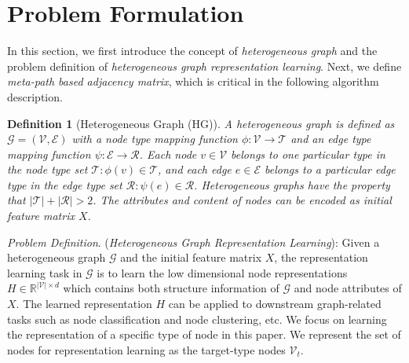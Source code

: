 \documentclass[conference]{IEEEtran}
\newtheorem{defn}{Definition}[section]\usepackage[ruled]{algorithm2e}
\begin{document}
\section{Problem Formulation}
	\label{sec:model}
In this section, we first introduce the concept of \textit{heterogeneous graph} and the problem definition of \textit{heterogeneous graph representation learning}. Next, we define \textit{meta-path based adjacency matrix}, which is critical in the following algorithm description.
	
	\noindent
	\begin{defn}[Heterogeneous Graph (HG)]
		A heterogeneous graph is defined as  $\mathcal{G} = (\mathcal{V}, \mathcal{E})$ with a node type mapping function $\phi : \mathcal{V}  \rightarrow \mathcal{T}$ and an edge type
		mapping function $\psi : \mathcal{E}  \rightarrow \mathcal{R}$. Each node $v \in\mathcal{V}$ belongs to one particular type in the node type set $\mathcal{T}: \phi(v) \in \mathcal{T}$, and each edge $e \in\mathcal{E}$  belongs to a particular edge type in the edge type set $\mathcal{R}: \psi(e) \in \mathcal{R}$. Heterogeneous graphs have the property that $|\mathcal{T}|+|\mathcal{R}| > 2$. The attributes and content of nodes can be encoded as initial feature matrix $X$.
\end{defn}
	
\noindent
	\emph{Problem Definition}. (\textit{Heterogeneous Graph Representation Learning}):  
	Given a heterogeneous graph $\mathcal{G}$ and the initial feature matrix $X$, the representation learning task in $\mathcal{G}$ is to learn the low dimensional node representations $H\in \mathbb{R}^{|\mathcal{V}|\times d}$ which contains both structure information of $\mathcal{G}$ and node attributes of $X$. The learned representation $H$ can be applied to downstream graph-related tasks such as node classification and node clustering, etc. 
	We focus on learning the representation of a specific type of node in this paper.
	We represent the set of nodes for representation learning as the target-type nodes $\mathcal{V}_t$.
	
\end{document}

